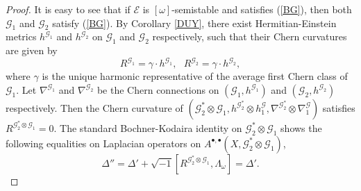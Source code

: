 \documentclass[english,reqno]{amsart}
\newcommand\sE{{\mathscr E}}
\newcommand\sG{{\mathscr G}}
\theoremstyle{plain}
\theoremstyle{definition}
\numberwithin{equation}{section} %
\begin{document}
\begin{proof}
    It is easy to see that if $\sE$ is $[\omega]$-semistable and
    satisfies  (\ref{BG}), then both $\sG_1$ and $\sG_2$ satisfy (\ref{BG}).
    By  Corollary \ref{DUY}, there exist Hermitian-Einstein metrics $h^{\sG_1}$
    and $h^{\sG_2}$ on $\sG_1$ and $\sG_2$ respectively, such that their Chern curvatures  are given by
    \begin{equation*}\label{equal}
    R^{\sG_1}=\gamma \cdot h^{\sG_1},\ \ \
    R^{\sG_2}=\gamma \cdot h^{\sG_2},
    \end{equation*}
    where  $\gamma$ is the
    unique harmonic representative of the average first Chern class of $\sG_1$. Let
    $\nabla^{\sG_1}$ and $\nabla^{\sG_2}$ be the Chern connections on $(\sG_1,h^{\sG_1})$ and
    $(\sG_2,h^{\sG_2})$ respectively.
    Then the Chern curvature of
    $(\sG_2^*\otimes \sG_1, h^{\sG_2^*}\otimes h^\sG_1, \nabla^{\sG_2^*}\otimes \nabla^\sG_1)$  satisfies $R^{\sG_2^*\otimes \sG_1}=0$.
    The standard
    Bochner-Kodaira identity on $\sG_2^*\otimes \sG_1$ shows the following equalities on Laplacian operators on
    $A^{\bullet,\bullet}(X,\sG_2^*\otimes \sG_1)$,
    \begin{equation*}
    \Delta''=\Delta'+\sqrt{-1}[R^{\sG_2^*\otimes \sG_1},\Lambda_\omega]=\Delta'.
    \end{equation*}




\end{proof}
\end{document}
